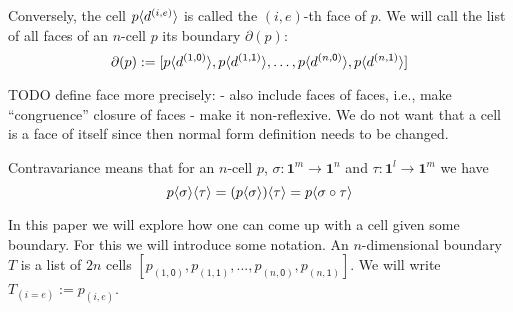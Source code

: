 \documentclass{llncs}
\newcommand{\mdef}{:=}
\newcommand{\mlist}[1]{[ {#1} ]}
\newcommand{\pint}[1]{\mathbf{1}^{#1}}
\newcommand{\pintrestr}[3]{\mathbf{1}^{#1}_{{#2}={#3}}}
\newcommand{\izero}{\mathsf{0}}
\newcommand{\ione}{\mathsf{1}}
\newcommand{\restrict}[2]{{#1}|_{#2}}
\newcommand{\smap}[1]{s^{{#1}}}
\newcommand{\dmap}[2]{d^{({#1} , {#2})}}
\newcommand{\cont}[2]{\ensuremath{ \ifthenelse{\equal{#2}{}}{#1}{{#1}\langle{#2}\rangle}} }
\newcommand{\boundary}[1]{\partial({#1})}
\begin{document}
Conversely, the cell $\cont{p}{\dmap{i}{e}}$ is called the $(i,e)$-th face of $p$. We
will call the list of all faces of an $n$-cell $p$ its boundary $\boundary{p}$:
$$\boundary{p} \mdef \mlist{ \cont{p}{\dmap{1}{\izero}},
  \cont{p}{\dmap{1}{\ione}} , \ldots , \cont{p}{\dmap{n}{\izero}}, \cont{p}{\dmap{n}{\ione}} }$$

TODO define face more precisely:
- also include faces of faces, i.e., make ``congruence'' closure of faces
- make it non-reflexive. We do not want that a cell is a face of itself since
then normal form definition needs to be changed.




Contravariance means that for an $n$-cell $p$, $\sigma : \pint{m} \to \pint{n}$ and $\tau : \pint{l} \to \pint{m}$ we have
$$\cont{\cont{p}{\sigma}}{\tau} = \cont{(\cont{p}{\sigma})}{\tau} = \cont{p}{\sigma \circ \tau}$$



In this paper we will explore how one can come up with a cell given some
boundary. For this we will introduce some notation. An
$n$-dimensional boundary $T$ is a list of $2n$ cells $\mlist{p_{(1,\izero)},
  p_{(1,\ione)} , ... , p_{(n,\izero)}, p_{(n, \ione)}}$. We will write
$T_{(i=e)} \mdef p_{(i,e)}$. %




\end{document}
